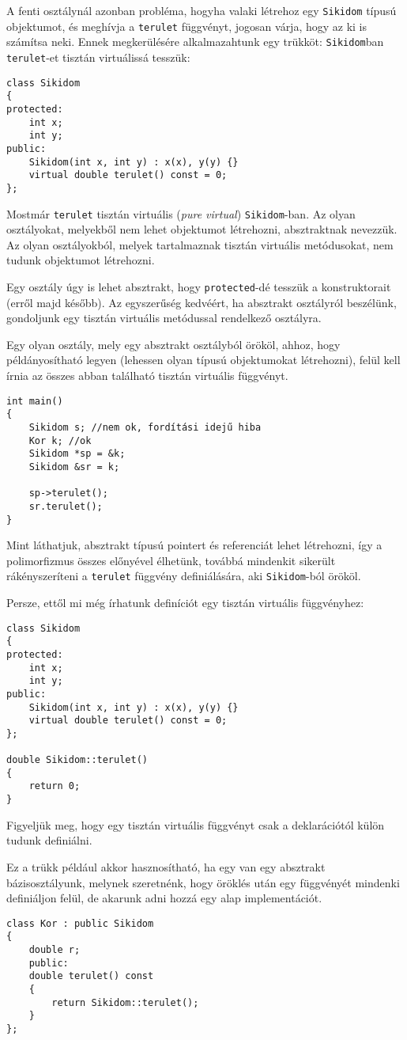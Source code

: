 \documentclass[a4paper,11.5pt,table]{article}
\begin{document}
	A fenti osztálynál azonban probléma, hogyha valaki létrehoz egy \texttt{Sikidom} típusú objektumot, és meghívja a \texttt{terulet} függvényt, jogosan várja, hogy az ki is számítsa neki. Ennek megkerülésére alkalmazahtunk egy trükköt: \texttt{Sikidom}ban \texttt{terulet}-et tisztán virtuálissá tesszük:
	
\begin{lstlisting}
class Sikidom
{
protected:
	int x;
	int y;
public:
	Sikidom(int x, int y) : x(x), y(y) {}
	virtual double terulet() const = 0;
};
\end{lstlisting}
	Mostmár \texttt{terulet} tisztán virtuális (\textit{pure virtual}) \texttt{Sikidom}-ban. Az olyan osztályokat, melyekből nem lehet objektumot létrehozni, absztraktnak nevezzük. Az olyan osztályokból, melyek tartalmaznak tisztán virtuális metódusokat, nem tudunk objektumot létrehozni.
	\begin{note}
		Egy osztály úgy is lehet absztrakt, hogy \texttt{protected}-dé tesszük a konstruktorait (erről majd később). Az egyszerűség kedvéért, ha absztrakt osztályról beszélünk, gondoljunk egy tisztán virtuális metódussal rendelkező osztályra.
	\end{note}
	Egy olyan osztály, mely egy absztrakt osztályból örököl, ahhoz, hogy példányosítható legyen (lehessen olyan típusú objektumokat létrehozni), felül kell írnia az összes abban található tisztán virtuális függvényt.
	\begin{lstlisting}
int main()
{
	Sikidom s; //nem ok, fordítási idejű hiba
	Kor k; //ok
	Sikidom *sp = &k;
	Sikidom &sr = k;
	
	sp->terulet();
	sr.terulet();
}
	\end{lstlisting}
	Mint láthatjuk, absztrakt típusú pointert és referenciát lehet létrehozni, így a polimorfizmus összes előnyével élhetünk, továbbá mindenkit sikerült rákényszeríteni a \texttt{terulet} függvény definiálására, aki \texttt{Sikidom}-ból örököl.
	
	Persze, ettől mi még írhatunk definíciót egy tisztán virtuális függvényhez:
\begin{lstlisting}
class Sikidom
{
protected:
	int x;
	int y;
public:
	Sikidom(int x, int y) : x(x), y(y) {}
	virtual double terulet() const = 0;
};

double Sikidom::terulet()
{
	return 0;
}
\end{lstlisting}
	Figyeljük meg, hogy egy tisztán virtuális függvényt csak a deklarációtól külön tudunk definiálni. 
	
	Ez a trükk például akkor hasznosítható, ha egy van egy absztrakt bázisosztályunk, melynek szeretnénk, hogy öröklés után egy függvényét mindenki definiáljon felül, de akarunk adni hozzá egy alap implementációt.
\begin{lstlisting}
class Kor : public Sikidom
{
	double r;
	public:
	double terulet() const
	{
		return Sikidom::terulet();
	}
};
\end{lstlisting}
	
\end{document}
